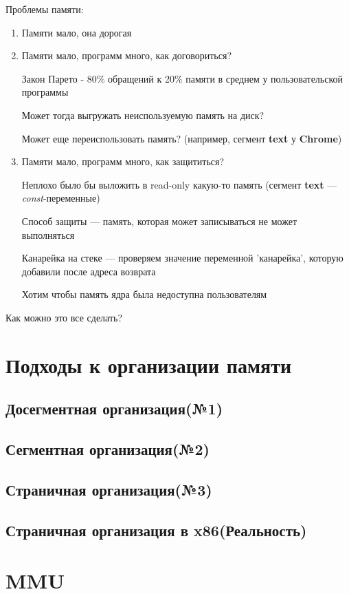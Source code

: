 \documentclass[../../lectures.tex]{subfiles}
\begin{document}
Проблемы памяти:
\begin{enumerate}
    \item Памяти мало, она дорогая
    \item Памяти мало, программ много, как договориться?

          Закон Парето - 80\% обращений к 20\% памяти в среднем у пользовательской программы

          Может тогда выгружать неиспользуемую память на диск?

          Может еще переиспользовать память? (например, сегмент \textbf{text} у \textbf{Chrome})
    \item Памяти мало, программ много, как защититься?

          Неплохо было бы выложить в read-only какую-то память 
          (сегмент \textbf{text} --- \emph{const}-переменные)


          Способ защиты --- память, которая может записываться не может выполняться

          Канарейка на стеке --- проверяем значение переменной 'канарейка', которую добавили после адреса возврата

          Хотим чтобы память ядра была недоступна пользователям
\end{enumerate}
Как можно это все сделать?

\newpage
\section{Подходы к организации памяти}
\todo{}
\subsection{Досегментная организация(№1)}
\subsection{Сегментная организация(№2)}
\subsection{Страничная организация(№3)}
\subsection{Страничная организация в x86(Реальность)}

\section{MMU}
\todo{}
\end{document}
